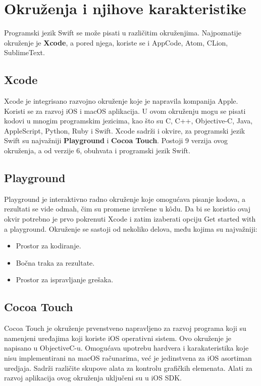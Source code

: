 \documentclass[a4paper]{article}
\begin{document}
\section{Okruženja i njihove karakteristike}	
\label{sec:petiDeo}
Programski jezik Swift se može pisati u različitim okruženjima. Najpoznatije okruženje je \textbf{Xcode}, a pored njega, koriste se i AppCode, Atom, CLion, SublimeText.

\subsection{Xcode}
\label{subsec:podnaslovXcode}
Xcode  je integrisano razvojno okruženje koje je napravila kompanija Apple. Koristi se za razvoj iOS i macOS aplikacija. U ovom okruženju mogu se pisati kodovi u mnogim programskim jezicima, kao što su C, C++, Objective-C, Java, AppleScript, Python, Ruby i Swift. Xcode sadrži i okvire, za programski jezik Swift su najvažniji \textbf{Playground} i \textbf{Cocoa Touch}. 
Postoji 9 verzija ovog okruženja, a od verzije 6, obuhvata i programski jezik Swift.

\subsection{Playground}
\label{subsec:podnaslovPlayground}
Playground je interaktivno radno okruženje koje omogućava pisanje kodova, a rezultati se vide odmah, čim su promene izvršene u k\^{o}du. Da bi se koristio ovaj okvir potrebno je prvo pokrenuti Xcode i zatim izaberati opciju Get started with a playground. Okruženje se sastoji od nekoliko delova, među kojima su najvažniji: 
\begin{itemize}
\item Prostor za kodiranje.
\item Bočna traka za rezultate.
\item Prostor za ispravljanje grešaka.
\end{itemize}

\subsection{Cocoa Touch}
\label{subsec:podnaslovCocoaTouch}

Cocoa Touch je okruženje prvenstveno napravljeno za razvoj programa
koji su namenjeni uređajima koji koriste iOS operativni sistem. Ovo okruženje je napisano u ObjectiveC-u. Omogućava upotrebu hardvera i karakateristika koje nisu implementirani na macOS računarima, već je jedinstvena za iOS asortiman uredjaja. Sadrži različite skupove alata za kontrolu grafičkih elemenata. Alati za razvoj aplikacija ovog okruženja uključeni su u iOS SDK.
\end{document}
